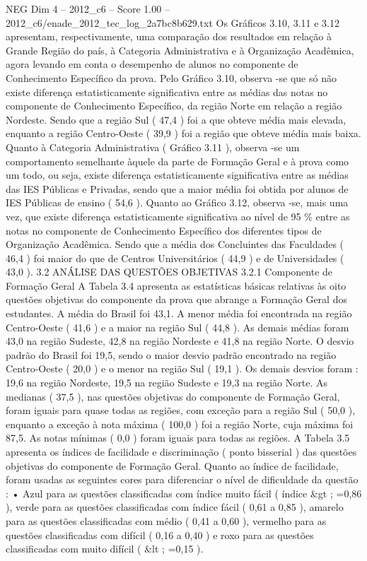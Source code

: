 \begin{textsample}{NEG Dim 4 – 2012\_c6 – Score 1.00 – 2012\_c6/enade\_2012\_tec\_log\_2a7bc8b629.txt}
Os Gráficos 3.10, 3.11 e 3.12 apresentam, respectivamente, uma comparação dos resultados em relação à Grande Região do país, à Categoria Administrativa e à Organização Acadêmica, agora levando em conta o desempenho de alunos no componente de Conhecimento Específico da prova.
Pelo Gráfico 3.10, observa -se que só não existe diferença estatisticamente significativa entre as médias das notas no componente de Conhecimento Específico, da região Norte em relação a região Nordeste.
Sendo que a região Sul ( 47,4 ) foi a que obteve média mais elevada, enquanto a região Centro-Oeste ( 39,9 ) foi a região que obteve média mais baixa.
Quanto à Categoria Administrativa ( Gráfico 3.11 ), observa -se um comportamento semelhante àquele da parte de Formação Geral e à prova como um todo, ou seja, existe diferença estatisticamente significativa entre as médias das IES Públicas e Privadas, sendo que a maior média foi obtida por alunos de IES Públicas de ensino ( 54,6 ).
Quanto ao Gráfico 3.12, observa -se, mais uma vez, que existe diferença estatisticamente significativa ao nível de 95 \% entre as notas no componente de Conhecimento Específico dos diferentes tipos de Organização Acadêmica.
Sendo que a média dos Concluintes das Faculdades ( 46,4 ) foi maior do que de Centros Universitários ( 44,9 ) e de Universidades ( 43,0 ). 3.2 ANÁLISE DAS QUESTÕES OBJETIVAS 3.2.1 Componente de Formação Geral A Tabela 3.4 apresenta as estatísticas básicas relativas às oito questões objetivas do componente da prova que abrange a Formação Geral dos estudantes.
A média do Brasil foi 43,1.
A menor média foi encontrada na região Centro-Oeste ( 41,6 ) e a maior na região Sul ( 44,8 ).
As demais médias foram 43,0 na região Sudeste, 42,8 na região Nordeste e 41,8 na região Norte.
O desvio padrão do Brasil foi 19,5, sendo o maior desvio padrão encontrado na região Centro-Oeste ( 20,0 ) e o menor na região Sul ( 19,1 ).
Os demais desvios foram : 19,6 na região Nordeste, 19,5 na região Sudeste e 19,3 na região Norte.
As medianas ( 37,5 ), nas questões objetivas do componente de Formação Geral, foram iguais para quase todas as regiões, com exceção para a região Sul ( 50,0 ), enquanto a exceção à nota máxima ( 100,0 ) foi a região Norte, cuja máxima foi 87,5.
As notas mínimas ( 0,0 ) foram iguais para todas as regiões.
A Tabela 3.5 apresenta os índices de facilidade e discriminação ( ponto bisserial ) das questões objetivas do componente de Formação Geral.
Quanto ao índice de facilidade, foram usadas as seguintes cores para diferenciar o nível de dificuldade da questão : • Azul para as questões classificadas com índice muito fácil ( índice \&gt ; =0,86 ), verde para as questões classificadas com índice fácil ( 0,61 a 0,85 ), amarelo para as questões classificadas com médio ( 0,41 a 0,60 ), vermelho para as questões classificadas com difícil ( 0,16 a 0,40 ) e roxo para as questões classificadas com muito difícil ( \&lt ; =0,15 ).

\end{textsample}
